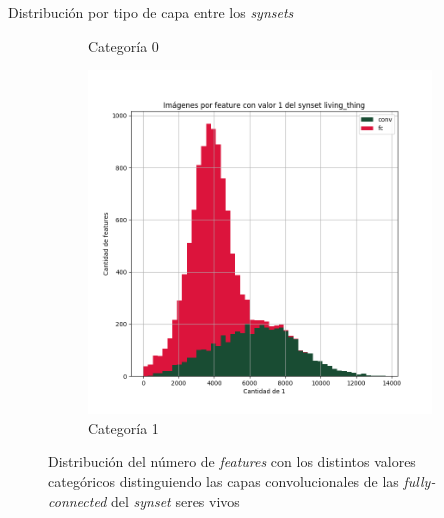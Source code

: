 \documentclass{beamer}
\begin{document}
\begin{frame}{Distribución por tipo de capa entre los \textit{synsets}}
\begin{figure}[ht]
\begin{subfigure}[b]{0.3\textwidth}
		\caption{Categoría 0}
	\end{subfigure}
	\begin{subfigure}[b]{0.3\textwidth}
		\includegraphics[width=\textwidth]  {Images/plots/25/synsets/Images_per_feature_of_1_category_living_thingall_layers.png}
		\caption{Categoría 1}
	\end{subfigure}       
	\caption{Distribución del número de \textit{features} con los distintos valores categóricos distinguiendo las capas convolucionales de las \textit{fully-connected} del \textit{synset} seres vivos \label{fig:imagesperfeatureliving}}
\end{figure}
\end{frame}
\end{document}
